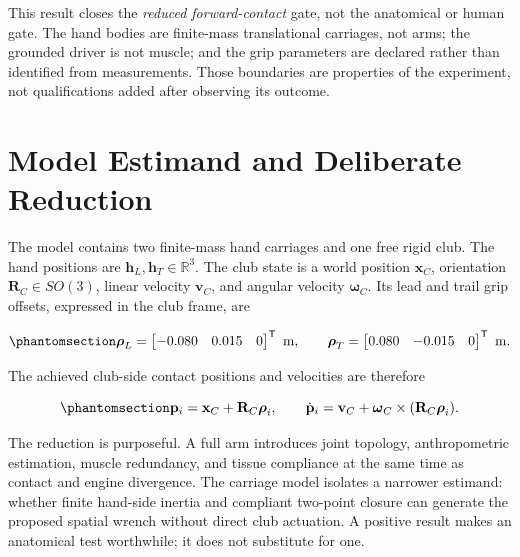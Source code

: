 \documentclass[
  letterpaper,
]{report}
\begin{document}
This result closes the \emph{reduced forward-contact} gate, not the
anatomical or human gate. The hand bodies are finite-mass translational
carriages, not arms; the grounded driver is not muscle; and the grip
parameters are declared rather than identified from measurements. Those
boundaries are properties of the experiment, not qualifications added
after observing its outcome.

\section{Model Estimand and Deliberate
Reduction}\label{sec-spatial-forward-estimand}

The model contains two finite-mass hand carriages and one free rigid
club. The hand positions are \(\mathbf h_L,\mathbf h_T\in\mathbb R^3\).
The club state is a world position \(\mathbf x_C\), orientation
\(\mathbf R_C\in SO(3)\), linear velocity \(\mathbf v_C\), and angular
velocity \(\boldsymbol\omega_C\). Its lead and trail grip offsets,
expressed in the club frame, are

\begin{equation}\phantomsection\label{eq-spatial-forward-grip-offsets}{
\boldsymbol\rho_L=
\begin{bmatrix}-0.080&0.015&0\end{bmatrix}^{\mathsf T}\ \mathrm{m},
\qquad
\boldsymbol\rho_T=
\begin{bmatrix}0.080&-0.015&0\end{bmatrix}^{\mathsf T}\ \mathrm{m}.
}\end{equation}

The achieved club-side contact positions and velocities are therefore

\begin{equation}\phantomsection\label{eq-spatial-forward-contact-kinematics}{
\mathbf p_i = \mathbf x_C + \mathbf R_C\boldsymbol\rho_i,
\qquad
\dot{\mathbf p}_i = \mathbf v_C
+\boldsymbol\omega_C\times(\mathbf R_C\boldsymbol\rho_i).
}\end{equation}

The reduction is purposeful. A full arm introduces joint topology,
anthropometric estimation, muscle redundancy, and tissue compliance at
the same time as contact and engine divergence. The carriage model
isolates a narrower estimand: whether finite hand-side inertia and
compliant two-point closure can generate the proposed spatial wrench
without direct club actuation. A positive result makes an anatomical
test worthwhile; it does not substitute for one.
\end{document}
